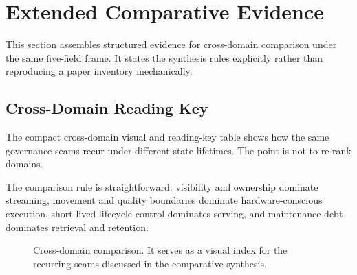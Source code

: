 \section{Extended Comparative Evidence}

This section assembles structured evidence for cross-domain comparison under the same five-field frame. It states the synthesis rules explicitly rather than reproducing a paper inventory mechanically.

\subsection{Cross-Domain Reading Key}

The compact cross-domain visual and reading-key table shows how the same governance seams recur under different state lifetimes. The point is not to re-rank domains.

The comparison rule is straightforward: visibility and ownership dominate streaming, movement and quality boundaries dominate hardware-conscious execution, short-lived lifecycle control dominates serving, and maintenance debt dominates retrieval and retention.

\begin{figure}[t]
\centering
\resizebox{0.96\textwidth}{!}{}
\caption{Cross-domain comparison. It serves as a visual index for the recurring seams discussed in the comparative synthesis.}
\label{fig:supp-cross-domain}
\end{figure}

